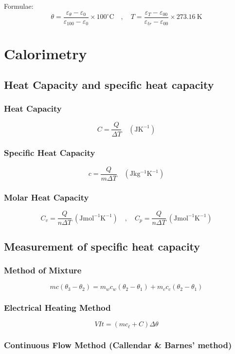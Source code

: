\documentclass{article}
\begin{document}
\noindent Formulae:
\[\theta = \frac{\varepsilon_\theta - \varepsilon_0}{\varepsilon_{100}-\varepsilon_0} \times 100^{\circ} \mathrm{C} \quad, \quad T=\frac{\varepsilon_T-\varepsilon_{00}}{\varepsilon_{tr}-\varepsilon_{00}} \times 273.16\mathrm{~K} \]

\section{Calorimetry }
\subsection*{Heat Capacity and specific heat capacity}

\subsubsection*{Heat Capacity}
\[C = \frac{Q}{\Delta T}\quad (\mathrm{JK^{-1}})\]

\subsubsection*{Specific Heat Capacity}
\[c = \frac{Q}{m\Delta T}\quad (\mathrm{Jkg^{-1}K^{-1}})\]

\subsubsection*{Molar Heat Capacity}
\[C_v = \frac{Q}{n\Delta T} \ (\mathrm{Jmol^{-1}K^{-1}})\quad , \quad C_p = \frac{Q}{n\Delta T} \ (\mathrm{Jmol^{-1}K^{-1}})\]

\subsection*{Measurement of specific heat capacity}

\subsubsection*{Method of Mixture}
\[mc(\theta_3-\theta_2)=m_wc_w(\theta_2-\theta_1)+m_cc_c(\theta_2-\theta_1)\]

\subsubsection*{Electrical Heating Method}
\[VIt=(mc_\ell+C)\Delta \theta\]

\subsubsection*{Continuous Flow Method (Callendar \& Barnes' method)}
\end{document}
